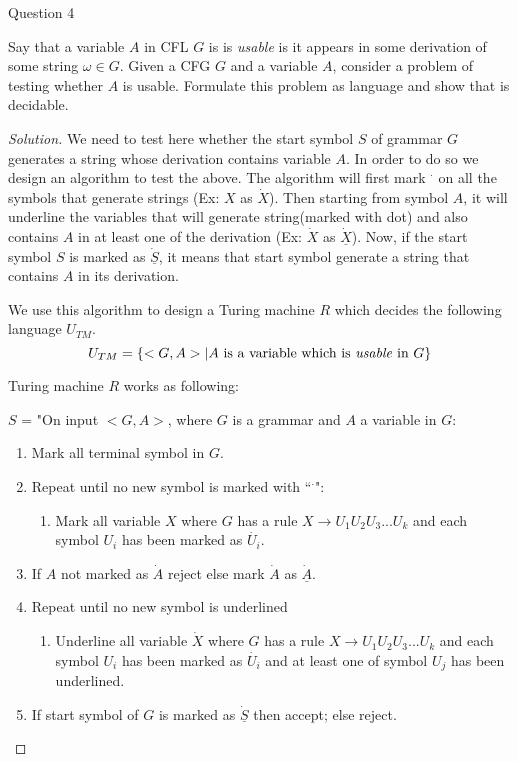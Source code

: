 \begin{solution}{Question 4}\label{ques:4}
    \begin{question}
        Say that a variable $A$ in CFL $G$ is is \emph{usable} is it appears in some derivation of some string $\omega \in G$. Given a CFG $G$ and a variable $A$, consider a problem of testing whether $A$ is usable. Formulate this problem as language and show that is decidable.
    \end{question}
    \tcblower{}
    \begin{proof}[Solution]
        We need to test here whether the start symbol $S$ of grammar $G$ generates a string whose derivation contains variable $A$. In order to do so we design an algorithm to test the above. The algorithm will first mark $^\cdot$ on all the symbols that generate strings (Ex: $X$ as $\dot{X}$). Then starting from symbol $A$, it will underline the variables that will generate string(marked with dot) and also contains $A$ in at least one of the derivation (Ex: $\dot{X}$ as $\underline{\dot{X}}$). Now, if the start symbol $S$ is marked as $\underline{\dot{S}}$, it means that start symbol generate a string that contains $A$ in its derivation.
        
        \bigskip
        
        We use this algorithm to design a Turing machine $R$ which decides the following language $U_{TM}$.
        \[U_{TM} = \{<G, A> | A \text{ is a variable which is \emph{usable} in } G \}\]
        
        Turing machine $R$ works as following:
        
        \bigskip
        
        $S$ = "On input $<G, A>$, where $G$ is a grammar and $A$ a variable in $G$:
        \begin{enumerate}
            \item Mark all terminal symbol in $G$.
            \item Repeat until no new symbol is marked with ``$^\cdot$":
            \begin{enumerate}
                \item Mark all variable $X$ where $G$ has a rule $X \longrightarrow U_1U_2U_3...U_k$ and each symbol $U_i$ has been marked as $\dot{U_i}$.
            \end{enumerate}
            \item If $A$ not marked as $\dot{A}$ reject else mark $\dot{A}$ as $\underline{\dot{A}}$.
            \item Repeat until no new symbol is underlined
            \begin{enumerate}
                \item Underline all variable $\dot{X}$ where $G$ has a rule  $X \longrightarrow U_1U_2U_3...U_k$ and each symbol $U_i$ has been marked as $\dot{U_i}$ and at least one of symbol $U_j$ has been underlined.
            \end{enumerate}
            \item If start symbol of $G$ is marked as $\underline{\dot{S}}$ then accept; else reject.
        \end{enumerate}
        

\end{proof}
\end{solution}

